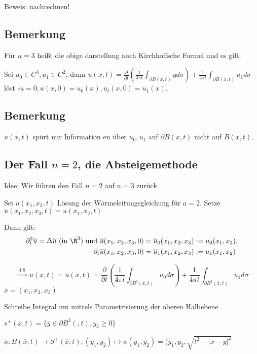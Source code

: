 Beweis: nachrechnen!

\subsection{Bemerkung}

Für $n = 3$ heißt die obige darstellung auch Kirchhoffsche Formel und es gilt:

Sei $u_0 \in C^3, u_1 \in C^2$, dann $u(x,t) = \frac{\partial}{\partial t}( \frac{1}{4\pi t} \int_{\partial B(x,t)} g d\sigma) + \frac{1}{4\pi t} \int_{\partial B(x,t)} u_1 d\sigma$ löst $\square u = 0, u(x,0) = u_0(x), u_t(x, 0) = u_1(x)$.

\subsection{Bemerkung}

$u(x,t)$ spürt nur Information en über $u_0, u_1$ auf $\partial B(x,t)$ nicht auf $B(x,t)$.

\subsection{Der Fall $n = 2$, die Absteigemethode}

Idee: Wir führen den Fall $n = 2$ auf $n = 3$ zurück.

Sei $u(x_1, x_2, t)$ Lösung der Wärmeleitungsgleichung für $a = 2$. 
Setze $\overline u(x_1, x_2, x_3, t) = u(x_1, x_2, t)$

Dann gilt:
\begin{align*}
\partial_t^2 \overline u = \Delta \overline u \text{ (in $\R^3$) und } 
\overline u(x_1, x_2, x_3, 0) &= \overline u_0(x_1, x_2, x_3) := u_0(x_1, x_2), \\
\partial_t \overline u (x_1, x_2, x_3, 0) &= \overline u_1(x_1, x_2, x_3) := u_1(x_1, x_2)
\end{align*}

$$\overset{4.8}{\implies} u(x,t) = \overline u(x,t) = \frac{\partial}{\partial t} \left(\frac{1}{4 \pi t} \int_{\partial B^3(\overline x, t)} \overline u_0 d\sigma \right) + \frac{1}{4 \pi t} \int_{\partial B^3(\overline x, t)} \overline u_1 d\sigma$$
{\tiny{$\overline x = (x_1, x_2, x_3)$}}

Schreibe Integral um mittels Parametrisierung der oberen Halbebene

$s^+(\overline x, t) = \{ \overline y \in \partial B^3(\overline , t), y_3 \geq 0\}$

$\phi \colon  B(\overline x, t) \to S^+(\overline x, t), (y_1, y_2) \mapsto \phi(y_1, y_2) = (y_1, y_2, \sqrt{t^2 - |x - y|^2}$

